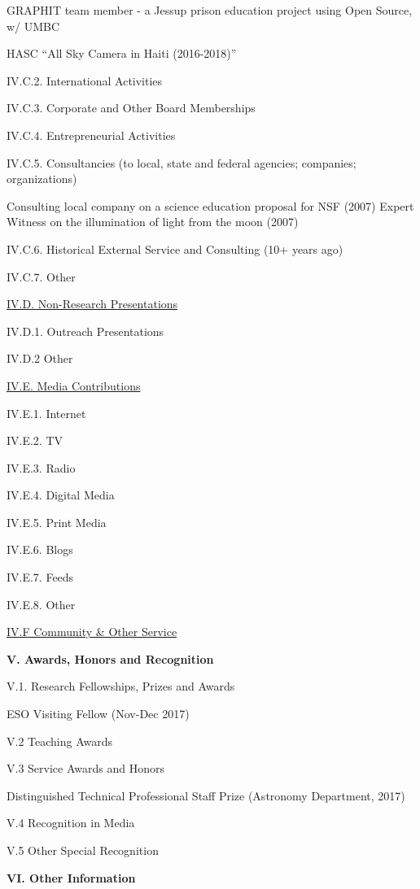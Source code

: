 \documentclass[11pt,letterpaper]{article}
\newcommand{\newi}{\newline\indent}
\begin{document}
GRAPHIT team member - a Jessup prison  education project using Open Source, w/ UMBC

HASC ``All Sky Camera in Haiti (2016-2018)''


IV.C.2. International Activities 

IV.C.3. Corporate and Other Board Memberships

IV.C.4. Entrepreneurial Activities

IV.C.5. Consultancies (to local, state and federal agencies; companies; organizations)

Consulting local company on a science education proposal for NSF (2007)\newi
Expert Witness on the illumination of light from the moon (2007)\newi
                
IV.C.6. Historical External Service and Consulting (10+ years ago)

IV.C.7. Other


\underline{IV.D. Non-Research Presentations}

IV.D.1. Outreach Presentations

IV.D.2 Other


\underline{IV.E. Media Contributions}

IV.E.1. Internet

IV.E.2. TV

IV.E.3. Radio

IV.E.4. Digital Media

IV.E.5. Print Media 

IV.E.6. Blogs

IV.E.7. Feeds

IV.E.8. Other


\underline{IV.F Community \& Other Service}


\textbf{V. Awards, Honors and Recognition}

V.1. Research Fellowships, Prizes and Awards

ESO Visiting Fellow (Nov-Dec 2017)

V.2 Teaching Awards

V.3 Service Awards and Honors

Distinguished Technical Professional Staff Prize (Astronomy Department, 2017)

V.4 Recognition in Media 

V.5 Other Special Recognition


\textbf{VI. Other Information}
\end{document}
